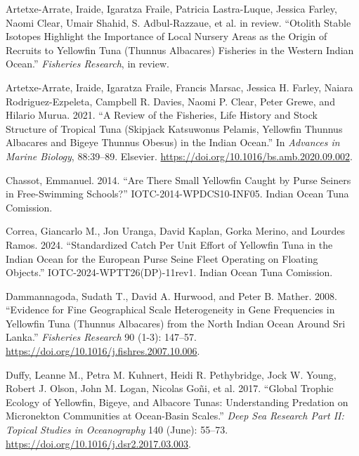 \documentclass[
]{scrartcl}
\newlength{\cslhangindent}
\newenvironment{CSLReferences}[2] %
 {\begin{list}{}{%
  \setlength{\itemindent}{0pt}
  \setlength{\leftmargin}{0pt}
  \setlength{\parsep}{0pt}
  \ifodd #1
   \setlength{\leftmargin}{\cslhangindent}
   \setlength{\itemindent}{-1\cslhangindent}
  \fi
  \setlength{\itemsep}{#2\baselineskip}}}
 {\end{list}}
\begin{document}
\label{refs}
\begin{CSLReferences}{1}{0}
Artetxe-Arrate, Iraide, Igaratza Fraile, Patricia Lastra-Luque, Jessica
Farley, Naomi Clear, Umair Shahid, S. Adbul-Razzaue, et al. in review.
{``Otolith Stable Isotopes Highlight the Importance of Local Nursery
Areas as the Origin of Recruits to Yellowfin Tuna ({Thunnus} Albacares)
Fisheries in the Western {Indian Ocean}.''} \emph{Fisheries Research},
in review.

Artetxe-Arrate, Iraide, Igaratza Fraile, Francis Marsac, Jessica H.
Farley, Naiara Rodriguez-Ezpeleta, Campbell R. Davies, Naomi P. Clear,
Peter Grewe, and Hilario Murua. 2021. {``A Review of the Fisheries, Life
History and Stock Structure of Tropical Tuna (Skipjack {Katsuwonus}
Pelamis, Yellowfin {Thunnus} Albacares and Bigeye {Thunnus} Obesus) in
the {Indian Ocean}.''} In \emph{Advances in {Marine Biology}},
88:39--89. Elsevier. \url{https://doi.org/10.1016/bs.amb.2020.09.002}.

Chassot, Emmanuel. 2014. {``Are There Small Yellowfin Caught by Purse
Seiners in Free-Swimming Schools?''} IOTC-2014-WPDCS10-INF05. Indian
Ocean Tuna Comission.

Correa, Giancarlo M., Jon Uranga, David Kaplan, Gorka Merino, and
Lourdes Ramos. 2024. {``Standardized Catch Per Unit Effort of Yellowfin
Tuna in the {Indian Ocean} for the {European} Purse Seine Fleet
Operating on Floating Objects.''} IOTC-2024-WPTT26(DP)-11rev1. Indian
Ocean Tuna Comission.

Dammannagoda, Sudath T., David A. Hurwood, and Peter B. Mather. 2008.
{``Evidence for Fine Geographical Scale Heterogeneity in Gene
Frequencies in Yellowfin Tuna ({Thunnus} Albacares) from the North
{Indian Ocean} Around {Sri Lanka}.''} \emph{Fisheries Research} 90
(1-3): 147--57. \url{https://doi.org/10.1016/j.fishres.2007.10.006}.

Duffy, Leanne M., Petra M. Kuhnert, Heidi R. Pethybridge, Jock W. Young,
Robert J. Olson, John M. Logan, Nicolas Goñi, et al. 2017. {``Global
Trophic Ecology of Yellowfin, Bigeye, and Albacore Tunas:
{Understanding} Predation on Micronekton Communities at Ocean-Basin
Scales.''} \emph{Deep Sea Research Part II: Topical Studies in
Oceanography} 140 (June): 55--73.
\url{https://doi.org/10.1016/j.dsr2.2017.03.003}.


\end{CSLReferences}
\end{document}
